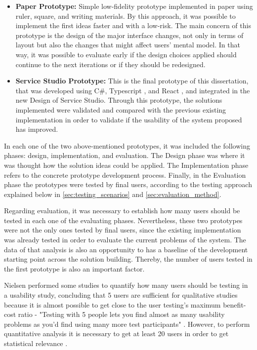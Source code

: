
\begin{itemize}
    \item \textbf{Paper Prototype: } Simple low-fidelity prototype implemented in paper using ruler, square, and writing materials. By this approach, it was possible to implement the first ideas faster and with a low-risk. The main concern of this prototype is the design of the major interface changes, not only in terms of layout but also the changes that might affect users' mental model. In that way, it was possible to evaluate early if the design choices applied should continue to the next iterations or if they should be redesigned.
    \item \textbf{Service Studio Prototype: } This is the final prototype of this dissertation, that was developed using C\#, Typescript \cite{typescript}, and React \cite{react}, and integrated in the new Design of Service Studio. Through this prototype, the solutions implemented were validated and compared with the previous existing implementation in order to validate if the usability of the system proposed has improved.
\end{itemize}

In each one of the two above-mentioned prototypes, it was included the following phases: design, implementation, and evaluation. The Design phase was where it was thought how the solution ideas could be applied. The Implementation phase refers to the concrete prototype development process. Finally, in the Evaluation phase the prototypes were tested by final users, according to the testing approach explained below in \ref{sec:testing_scenarios} and \ref{sec:evaluation_method}.

Regarding evaluation, it was necessary to establish how many users should be tested in each one of the evaluating phases. Nevertheless, these two prototypes were not the only ones tested by final users, since the existing implementation was already tested in order to evaluate the current problems of the system. The data of that analysis is also an opportunity to has a baseline of the development starting point across the solution building. Thereby, the number of users tested in the first prototype is also an important factor.

Nielsen performed some studies to quantify how many users should be testing in a usability study, concluding that 5 users are sufficient for qualitative studies because it is almost possible to get close to the user testing's maximum benefit-cost ratio - "Testing with 5 people lets you find almost as many usability problems as you'd find using many more test participants" \cite{why_you_only_need_to_test_with_5_users} \cite{how_many_test_users_in_a_usability_study}. However, to perform quantitative analysis it is necessary to get at least 20 users in order to get statistical relevance \cite{how_many_test_users_in_a_usability_study}.

